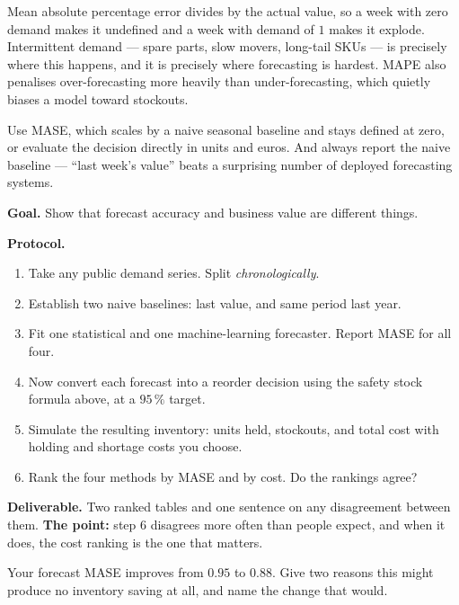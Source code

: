 \begin{cautionbox}
Mean absolute percentage error divides by the actual value, so a week with zero
demand makes it undefined and a week with demand of $1$ makes it explode.
Intermittent demand --- spare parts, slow movers, long-tail SKUs --- is precisely
where this happens, and it is precisely where forecasting is hardest. MAPE also
penalises over-forecasting more heavily than under-forecasting, which quietly
biases a model toward stockouts.

Use MASE, which scales by a naive seasonal baseline and stays defined at zero,
or evaluate the decision directly in units and euros. And always report the
naive baseline --- ``last week's value'' beats a surprising number of deployed
forecasting systems.
\end{cautionbox}

\begin{practicallab}
\textbf{Goal.} Show that forecast accuracy and business value are different
things.

\textbf{Protocol.}
\begin{enumerate}
  \item Take any public demand series. Split \emph{chronologically}.
  \item Establish two naive baselines: last value, and same period last year.
  \item Fit one statistical and one machine-learning forecaster. Report MASE
        for all four.
  \item Now convert each forecast into a reorder decision using the safety
        stock formula above, at a $95\,\%$ target.
  \item Simulate the resulting inventory: units held, stockouts, and total cost
        with holding and shortage costs you choose.
  \item Rank the four methods by MASE and by cost. Do the rankings agree?
\end{enumerate}

\textbf{Deliverable.} Two ranked tables and one sentence on any disagreement
between them. \textbf{The point:} step 6 disagrees more often than people
expect, and when it does, the cost ranking is the one that matters.
\end{practicallab}

\begin{checkpoint}
Your forecast MASE improves from $0.95$ to $0.88$. Give two reasons this might
produce no inventory saving at all, and name the change that would.
\end{checkpoint}

